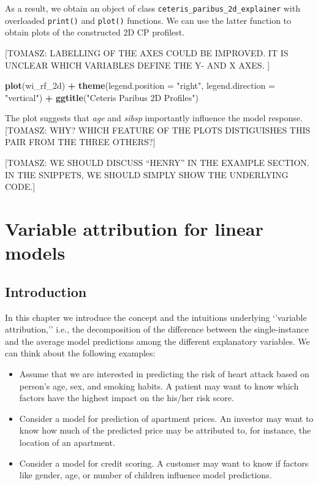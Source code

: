 \documentclass[12pt,]{krantz}
\newenvironment{Shaded}{\begin{snugshade}}{\end{snugshade}}
\newcommand{\DataTypeTok}[1]{\textcolor[rgb]{0.13,0.29,0.53}{#1}}
\newcommand{\KeywordTok}[1]{\textcolor[rgb]{0.13,0.29,0.53}{\textbf{#1}}}
\newcommand{\NormalTok}[1]{#1}
\newcommand{\OperatorTok}[1]{\textcolor[rgb]{0.81,0.36,0.00}{\textbf{#1}}}
\newcommand{\StringTok}[1]{\textcolor[rgb]{0.31,0.60,0.02}{#1}}
\providecommand{\tightlist}{%
  \setlength{\itemsep}{0pt}\setlength{\parskip}{0pt}}
\theoremstyle{definition}
\theoremstyle{definition}
\theoremstyle{definition}
\theoremstyle{remark}
\begin{document}
As a result, we obtain an object of class
\texttt{ceteris\_paribus\_2d\_explainer} with overloaded
\texttt{print()} and \texttt{plot()} functions. We can use the latter
function to obtain plots of the constructed 2D CP profilest.

{[}TOMASZ: LABELLING OF THE AXES COULD BE IMPROVED. IT IS UNCLEAR WHICH
VARIABLES DEFINE THE Y- AND X AXES. {]}

\begin{Shaded}
\begin{Highlighting}[]
\KeywordTok{plot}\NormalTok{(wi_rf_2d) }\OperatorTok{+}\StringTok{ }
\StringTok{  }\KeywordTok{theme}\NormalTok{(}\DataTypeTok{legend.position =} \StringTok{"right"}\NormalTok{, }\DataTypeTok{legend.direction =} \StringTok{"vertical"}\NormalTok{) }\OperatorTok{+}\StringTok{ }\KeywordTok{ggtitle}\NormalTok{(}\StringTok{"Ceteris Paribus 2D Profiles"}\NormalTok{)}
\end{Highlighting}
\end{Shaded}

The plot suggests that \emph{age} and \emph{sibsp} importantly influence
the model response. {[}TOMASZ: WHY? WHICH FEATURE OF THE PLOTS
DISTIGUISHES THIS PAIR FROM THE THREE OTHERS?{]}

{[}TOMASZ: WE SHOULD DISCUSS ``HENRY'' IN THE EXAMPLE SECTION. IN THE
SNIPPETS, WE SHOULD SIMPLY SHOW THE UNDERLYING CODE.{]}

\hypertarget{variableAttributionMethods}{%
\section{Variable attribution for linear
models}\label{variableAttributionMethods}}

\hypertarget{introduction-2}{%
\subsection{Introduction}\label{introduction-2}}

In this chapter we introduce the concept and the intuitions underlying
`'variable attribution,'' i.e., the decomposition of the difference
between the single-instance and the average model predictions among the
different explanatory variables. We can think about the following
examples:

\begin{itemize}
\tightlist
\item
  Assume that we are interested in predicting the risk of heart attack
  based on person's age, sex, and smoking habits. A patient may want to
  know which factors have the highest impact on the his/her risk score.
\item
  Consider a model for prediction of apartment prices. An investor may
  want to know how much of the predicted price may be attributed to, for
  instance, the location of an apartment.
\item
  Consider a model for credit scoring. A customer may want to know if
  factors like gender, age, or number of children influence model
  predictions.
\end{itemize}
\end{document}
